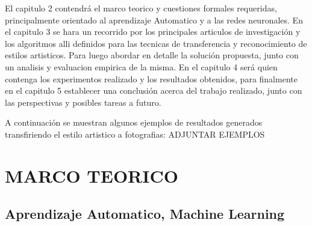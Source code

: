 \documentclass[a4paper,10pt]{article}
\begin{document}
El capitulo 2 contendrá el marco teorico y cuestiones formales requeridas, principalmente orientado al aprendizaje Automatico y a las redes neuronales.
En el capitulo 3 se hara un recorrido por los principales articulos de investigación y los algoritmos alli definidos para las tecnicas de transferencia y reconocimiento de estilos artisticos.
Para luego abordar en detalle la solución propuesta, junto con un analisis y evaluacion empirica de la misma.
En el capitulo 4 será quien contenga los experimentos realizado y los resultados obtenidos, para finalmente en el capitulo 5 establecer una conclusión acerca del trabajo realizado, 
junto con las perspectivas y posibles tareas a futuro.

A continuación se muestran algunos ejemplos de resultados generados transfiriendo el estilo artistico a fotografias:
ADJUNTAR EJEMPLOS


\section{MARCO TEORICO}




\subsection{Aprendizaje Automatico, Machine Learning}
\end{document}

